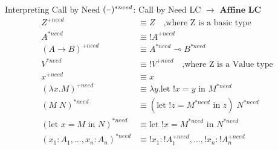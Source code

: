 \documentclass[10pt]{beamer}
\newcommand{\lam}[2]{\lambda #1 . #2}
\newcommand{\llet}[3]{\text{let }  ! #1 = #2 \text{ in } #3}
\newcommand{\plet}[3]{\text{let }   #1 = #2 \text{ in } #3}
\newcommand{\app}[2]{#1 \; #2}
\newcommand{\minus}{\scalebox{0.75}[1.0]{$-$}}
\begin{document}
\begin{frame}[fragile]{Interpreting Call by Need}
  $(\minus)^{*need}$: Call by Need LC $\to$ $\textbf{Affine LC}$\\
  \begin{align*}
    Z^{+need}                             & \equiv Z \quad \text{,where Z is a basic type}             \\
    A^{*need}                             & \equiv ! A^{+need}                                         \\
    (A \rightarrow B)^{+need}             & \equiv A^{*need} \multimap B^{*need}                       \\
    V^{*need}                             & \equiv ! V^{+need} \quad \text{,where Z is a Value type}   \\
    x^{+need}                             & \equiv x                                                   \\
    (\lam{x}{M})^{+need}                  & \equiv \lam{y}{\llet{x}{y}{M^{*need}}}                     \\
    (\app{M}{N})^{*need}                  & \equiv \app{(\llet{z}{M^{*need}}{z})}{N^{*need}}           \\
    (\plet{x}{M}{N})^{*need}              & \equiv \llet{x}{M^{*need}}{N^{*need}}                      \\
    (x_1 : A_1, \dots, x_n : A_n)^{*need} & \equiv ! x_1 : ! A_1^{+need}, \dots, ! x_n : ! A_n^{+need} \\
  \end{align*}
\end{frame}
\end{document}
